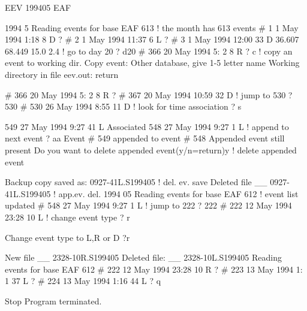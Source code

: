 \begin{boxedverbatim}
EEV 199405 EAF

1994  5 Reading events for base EAF         613   ! the month has 613 events
#    1  1 May 1994  1:18  8 D                                               ? 
#    2  1 May 1994 11:37  6 L                                               ? 
#    3  1 May 1994 12:00 33 D   36.607   68.449 15.0  2.4    ! go to day 20 ? d20
#  366 20 May 1994  5: 2  8 R                                               ? c
                                                ! copy an event to working dir.
 Copy event: Other database, give 1-5 letter name
             Working directory in file eev.out: return

#  366 20 May 1994  5: 2  8 R                                              ? 
#  367 20 May 1994 10:59 32 D      ! jump to 530                           ? 530
#  530 26 May 1994  8:55 11 D      ! look for time association             ? s
 
  549 27 May 1994  9:27 41 L                                        Associated
  548 27 May 1994  9:27  1 L       ! append to next event            ? aa
 Event #  549 appended to event #  548   Appended event still present
 Do you want to delete appended event(y/n=return)y   ! delete appended event

Backup copy saved as: \seismo\REA\DELET{} 0927-41L.S199405 ! del. ev. save   
Deleted file          \seismo\REA\EAF__ 0927-41L.S199405 ! app.ev. del.
1994 05 Reading events for base EAF         612    ! event list updated
#  548 27 May 1994  9:27  1 L                     ! jump to 222            ? 222
#  222 12 May 1994 23:28 10 L                     ! change event type      ? r
 
 Change event type to L,R or D ?r

New file       \seismo\REA\EAF__ 2328-10R.S199405      
Deleted file:  \seismo\REA\EAF__ 2328-10L.S199405    
Reading events for base EAF         612
#  222 12 May 1994 23:28 10 R                                        ? 
#  223 13 May 1994  1: 1 37 L                                        ? 
#  224 13 May 1994  1:16 44 L                                        ? q

Stop   Program terminated.\end{boxedverbatim}
